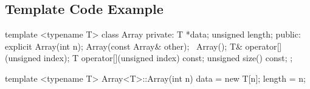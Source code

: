 
\begin{slide}
\section[-2]{Template Code Example}

\begin{cpp}
template <typename T>
class Array {
private:
  T *data;
  unsigned length;
public:
  explicit Array(int n);
  Array(const Array& other);
  ~Array();
  T& operator[](unsigned index);
  T operator[](unsigned index) const;
  unsigned size() const;
};

template <typename T>
Array<T>::Array(int n) {
  data = new T[n];
  length = n;
}
\end{cpp}
\end{slide}
